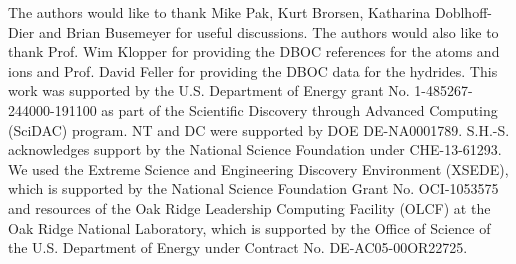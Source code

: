 The authors would like to thank Mike Pak, Kurt Brorsen, Katharina Doblhoff-Dier and Brian Busemeyer for useful discussions. The authors would also like to thank Prof. Wim Klopper for providing the DBOC references for the atoms and ions and Prof. David Feller for providing the DBOC data for the hydrides. This work was supported by the U.S. Department of Energy grant No. 1-485267-244000-191100 as part of the Scientific Discovery through Advanced Computing (SciDAC) program. NT and DC were supported by DOE DE-NA0001789. S.H.-S. acknowledges support by the National Science Foundation under CHE-13-61293. We used the Extreme Science and Engineering Discovery Environment (XSEDE), which is supported by the National Science Foundation Grant No. OCI-1053575 and resources of the Oak Ridge Leadership Computing Facility (OLCF) at the Oak Ridge National Laboratory, which is supported by the Office of Science of the U.S. Department of Energy under Contract No. DE-AC05-00OR22725.